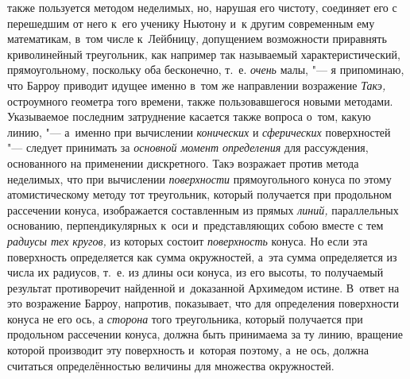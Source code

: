также пользуется методом неделимых, но, нарушая его чистоту, соединяет его с
перешедшим от него к~его ученику Ньютону и~к другим современным ему
математикам, в~том числе к~Лейбницу, допущением возможности приравнять
криволинейный треугольник, как например так называемый характеристический,
прямоугольному, поскольку оба бесконечно, т.~е. {\em очень} малы, "--- я
припоминаю, что Барроу приводит идущее именно в~том же направлении возражение
{\em Такэ,} остроумного геометра того времени, также пользовавшегося новыми
методами. Указываемое последним затруднение касается также вопроса о~том, какую
линию, "--- а~именно при вычислении {\em конических} и {\em сферических}
поверхностей "--- следует принимать за {\em основной момент определения} для
рассуждения, основанного на применении дискретного. Такэ возражает против
метода неделимых, что при вычислении {\em поверхности} прямоугольного конуса по
этому атомистическому методу тот треугольник, который получается при продольном
рассечении конуса, изображается составленным из прямых {\em линий,}
параллельных основанию, перпендикулярных к~оси и~представляющих собою вместе с
тем {\em радиусы тех кругов,} из которых состоит {\em поверхность} конуса. Но
если эта поверхность определяется как сумма окружностей, а~эта сумма
определяется из числа их радиусов, т.~е. из длины оси конуса, из его высоты, то
получаемый результат противоречит найденной и~доказанной Архимедом истине.
В~ответ на это возражение Барроу, напротив, показывает, что для определения
поверхности конуса не его ось, а {\em сторона} того треугольника, который
получается при продольном рассечении конуса, должна быть принимаема за ту
линию, вращение которой производит эту поверхность и~которая поэтому, а~не ось,
должна считаться определённостью величины для множества окружностей.

